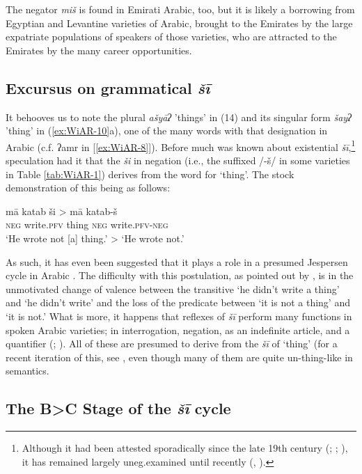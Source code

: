 \documentclass[output=paper]{langsci/langscibook}
\begin{document}
The negator \textit{miš} is found in Emirati Arabic, too, but it is likely a borrowing from Egyptian and Levantine varieties of Arabic, brought to the Emirates by the large expatriate populations of speakers of those varieties, who are attracted to the Emirates by the many career opportunities.

\subsection{Excursus on grammatical \textit{šī}} \label{s:WiAR-3.3}

It behooves us to note the plural \textit{ašyāʔ} ’things’ in (14) and its singular form \textit{šayʔ} ’thing’ in (\ref{ex:WiAR-10}a), one of the many words with that designation in Arabic (c.f. ʔamr in [\ref{ex:WiAR-8}]). Before much was known about existential \textit{šī},\footnote{Although it had been attested sporadically since the late 19th century  (\citealp[112]{reinhardt1894a}; \citealp[170]{johnstone1967a}; \citealp[24]{brockett1985a}), it has remained largely uneg.examined until recently (\citealp[24-28]{holes2016a}, \citealp{wilmsen2017a, wilmsen2020a}).} speculation had it that the \textit{ši} in negation (i.e., the suffixed /-š/ in some varieties in Table \ref{tab:WiAR-1}) derives from the word for ‘thing’. The stock demonstration of this being as follows:

\ea \label{ex:WiAR-17}
	\gll mā katab ši > mā katab-š\\
	\textsc{neg} write.\textsc{pfv} thing {} \textsc{neg} write.\textsc{pfv-neg}\\
	\glt ‘He wrote not [a] thing.’ > ‘He wrote not.’
\z

As such, it has even been suggested that it plays a role in a presumed Jespersen cycle in Arabic \citep{lucas2007a}. The difficulty with this postulation, as pointed out by \citet[139]{woidich1990a}, is in the unmotivated change of valence between the transitive ‘he didn’t write a thing’ and ‘he didn’t write’ and the loss of the predicate between ‘it is not a thing’ and ‘it is not.’ What is more, it happens that reflexes of \textit{šī} perform many functions in spoken Arabic varieties; in interrogation, negation, as an indefinite article, and a quantifier (\citealp[44-63]{wilmsen2014a}; \citealp{wilmsen2017a}). All of these are presumed to derive from the \textit{šī} of ‘thing’ (for a recent iteration of this, see \citet{glanville2018a}, even though many of them are quite un-thing-like in semantics. 

\subsection{The B>C Stage of the \textit{šī} cycle} \label{s:WiAR-3.4}
\end{document}
